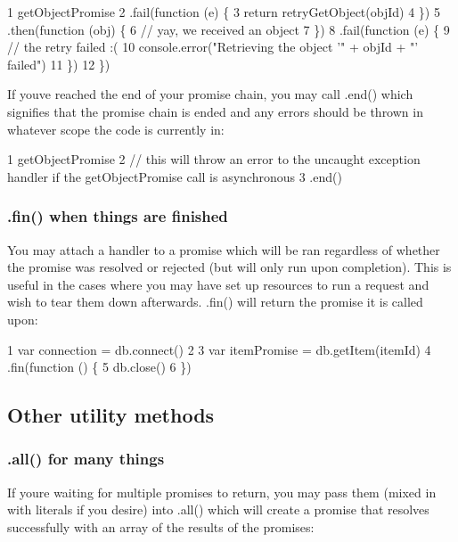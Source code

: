 \begin{DoxyCode}
1 getObjectPromise
2   .fail(function (e) \{
3     return retryGetObject(objId)
4   \})
5   .then(function (obj) \{
6     // yay, we received an object
7   \})
8   .fail(function (e) \{
9     // the retry failed :(
10     console.error("Retrieving the object '" + objId + "' failed")
11   \})
12 \})
\end{DoxyCode}


If you\textquotesingle{}ve reached the end of your promise chain, you may call {\ttfamily .end()} which signifies that the promise chain is ended and any errors should be thrown in whatever scope the code is currently in\+:


\begin{DoxyCode}
1 getObjectPromise
2   // this will throw an error to the uncaught exception handler if the getObjectPromise call is
       asynchronous
3   .end()
\end{DoxyCode}


\subsubsection*{{\ttfamily .fin()} when things are finished}

You may attach a handler to a promise which will be ran regardless of whether the promise was resolved or rejected (but will only run upon completion). This is useful in the cases where you may have set up resources to run a request and wish to tear them down afterwards. {\ttfamily .fin()} will return the promise it is called upon\+:


\begin{DoxyCode}
1 var connection = db.connect()
2 
3 var itemPromise = db.getItem(itemId)
4   .fin(function () \{
5     db.close()
6   \})
\end{DoxyCode}


\subsection*{Other utility methods }

\subsubsection*{{\ttfamily .all()} for many things}

If you\textquotesingle{}re waiting for multiple promises to return, you may pass them (mixed in with literals if you desire) into {\ttfamily .all()} which will create a promise that resolves successfully with an array of the results of the promises\+:


